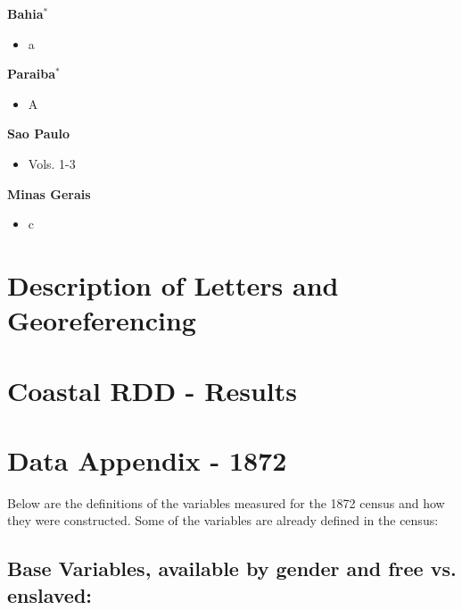 \documentclass{article}
\begin{document}
\textbf{Bahia$^*$}
\begin{itemize}
\item a
\end{itemize}

\textbf{Paraiba$^*$}
\begin{itemize}
\item A
\end{itemize}


\textbf{Sao Paulo}
\begin{itemize}
\item \textcite{noauthor_1921-qd} Vols. 1-3 
\end{itemize}

\textbf{Minas Gerais}
\begin{itemize}
\item c 
\end{itemize}

\clearpage

\section{Description of Letters and Georeferencing}
\label{app:appendix_data}
\clearpage

\section{Coastal RDD - Results}
\label{app:coastal_rdd}
\clearpage

\section{Data Appendix - 1872}
\label{app:variable_construction_1872}

Below are the definitions of the variables measured for the 1872 census and how they were constructed. Some of the variables are already defined in the census:

\subsection{Base Variables, available by gender and free vs. enslaved:}
\end{document}
